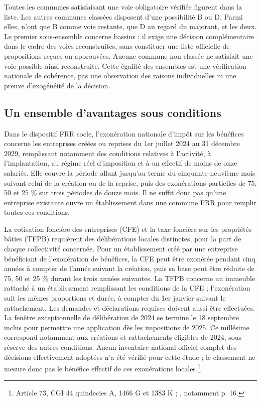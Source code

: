 Toutes les \AssignmentMandatoryN{} communes satisfaisant une voie obligatoire vérifiée figurent dans la liste. Les \AssignmentResidualN{} autres communes classées disposent d’une possibilité B ou D. Parmi elles, \AssignmentBOnlyN{} n’ont que B comme voie restante, \AssignmentDOnlyN{} que D au regard du majorant, et \AssignmentBothN{} les deux. Le premier sous-ensemble concerne \AssignmentBOnlyBVN{} bassins ; il exige une décision complémentaire dans le cadre des voies reconstruites, sans constituer une liste officielle de propositions reçues ou approuvées. Aucune commune non classée ne satisfait une voie possible ainsi reconstruite. Cette égalité des ensembles est une vérification nationale de cohérence, pas une observation des raisons individuelles ni une preuve d’exogénéité de la décision.
\FloatBarrier

\subsection{Un ensemble d’avantages sous conditions}
Dans le dispositif FRR socle, l’exonération nationale d’impôt sur les bénéfices concerne les entreprises créées ou reprises du 1er juillet 2024 au 31 décembre 2029, remplissant notamment des conditions relatives à l’activité, à l’implantation, au régime réel d’imposition et à un effectif de moins de onze salariés. Elle couvre la période allant jusqu’au terme du cinquante-neuvième mois suivant celui de la création ou de la reprise, puis des exonérations partielles de 75, 50 et 25 \% sur trois périodes de douze mois. Il ne suffit donc pas qu’une entreprise existante ouvre un établissement dans une commune FRR pour remplir toutes ces conditions.

La cotisation foncière des entreprises (CFE) et la taxe foncière sur les propriétés bâties (TFPB) requièrent des délibérations locales distinctes, pour la part de chaque collectivité concernée. Pour un établissement créé par une entreprise bénéficiant de l’exonération de bénéfices, la CFE peut être exonérée pendant cinq années à compter de l’année suivant la création, puis sa base peut être réduite de 75, 50 et 25 \% durant les trois années suivantes. La TFPB concerne un immeuble rattaché à un établissement remplissant les conditions de la CFE ; l’exonération suit les mêmes proportions et durée, à compter du 1er janvier suivant le rattachement. Les demandes et déclarations requises doivent aussi être effectuées. La fenêtre exceptionnelle de délibération de 2024 se termine le 18 septembre inclus pour permettre une application dès les impositions de 2025. Ce millésime correspond notamment aux créations et rattachements éligibles de 2024, sous réserve des autres conditions. Aucun inventaire national officiel complet des décisions effectivement adoptées n’a été vérifié pour cette étude ; le classement ne mesure donc pas le bénéfice effectif de ces exonérations locales.\footnote{Article 73, CGI 44 quindecies A, 1466 G et 1383 K ; , notamment p. 16.}

